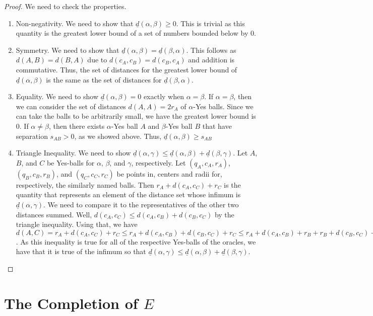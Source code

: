 \documentclass[12pt]{article}
\begin{document}
\begin{proof}
We need to check the properties. 
\begin{enumerate}
\item Non-negativity. We need to show that $\underline{d}(\alpha, \beta) \geq 0$. This is trivial as this quantity is the greatest lower bound of a set of numbers bounded below by 0. 
\item Symmetry. We need to show that $\underline{d}(\alpha,\beta) = \underline{d}(\beta,\alpha)$. This follows as $d(A,B) = d(B,A)$ due to $d(c_A, c_B) = d(c_B, c_A)$ and addition is commutative. Thus, the set of distances for the greatest lower bound of $\underline{d}(\alpha,\beta)$ is the same as the set of distances for $\underline{d}(\beta,\alpha)$.
\item Equality. We need to show $\underline{d}(\alpha,\beta) = 0$ exactly when $\alpha=\beta$. If $\alpha=\beta$, then we can consider the set of distances $d(A,A)= 2r_A$ of $\alpha$-Yes balls. Since we can take the balls to be arbitrarily small, we have the greatest lower bound is 0. If $\alpha \neq \beta$, then there exists $\alpha$-Yes ball $A$ and $\beta$-Yes ball $B$ that have separation $s_{AB} > 0$, as we showed above. Thus, $\underline{d}(\alpha,\beta) \geq s_{AB}$ 
\item Triangle Inequality. We need to show $\underline{d}(\alpha,\gamma) \leq \underline{d}(\alpha,\beta) + \underline{d}(\beta,\gamma)$. Let $A$, $B$, and $C$ be Yes-balls for $\alpha$, $\beta$, and $\gamma$, respectively. Let $(q_A,c_A, r_A)$, $(q_B,c_B, r_B)$, and $(q_C,c_C, r_C)$ be points in, centers and radii for, respectively, the similarly named balls. Then $r_A + d(c_A, c_C) + r_C$ is the quantity that represents an element of the distance set whose infimum is $\underline{d}(\alpha,\gamma)$. We need to compare it to the representatives of the other two distances summed. Well, $d(c_A,c_C) \leq d(c_A,c_B) + d(c_B, c_C)$ by the triangle inequality. Using that, we have  $d(A, C) = r_A + d(c_A, c_C) + r_C \leq r_A +  d(c_A,c_B) + d(c_B, c_C) + r_C \leq  r_A +  d(c_A,c_B) + r_B + r_B + d(c_B, c_C) + r_ C = d(A,B) + d(B, C)$. As this inequality is true for all of the respective Yes-balls of the oracles, we have that it is true of the infimum so that $\underline{d}(\alpha, \gamma) \leq \underline{d}(\alpha,\beta) + \underline{d}(\beta,\gamma)$. 
\end{enumerate}
\end{proof}


\section{The Completion of \texorpdfstring{$E$}{E}}
\end{document}
